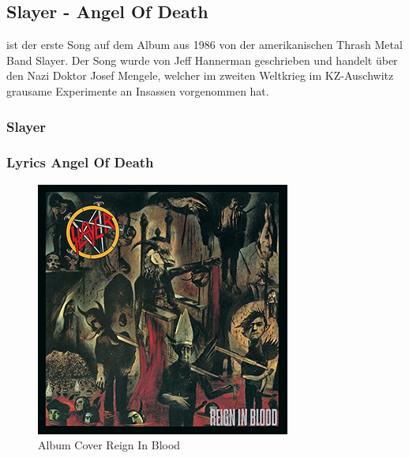 \documentclass[twocolumn,10pt]{article}
\begin{document}
		\subsection{Slayer - Angel Of Death}
			 ist der erste Song auf dem Album  aus 1986 von der amerikanischen Thrash Metal Band Slayer. Der Song wurde von Jeff Hannerman geschrieben und handelt über den Nazi Doktor Josef Mengele, welcher im zweiten Weltkrieg im KZ-Auschwitz grausame Experimente an Insassen vorgenommen hat.\\
			
			\subsubsection{Slayer}
			\clearpage
			\subsubsection{Lyrics Angel Of Death}
			\begin{figure}[H]
				\centering\includegraphics[width=\linewidth]{ReignInBlood.jpg}
				\caption{Album Cover Reign In Blood}
			\end{figure}
\end{document}
